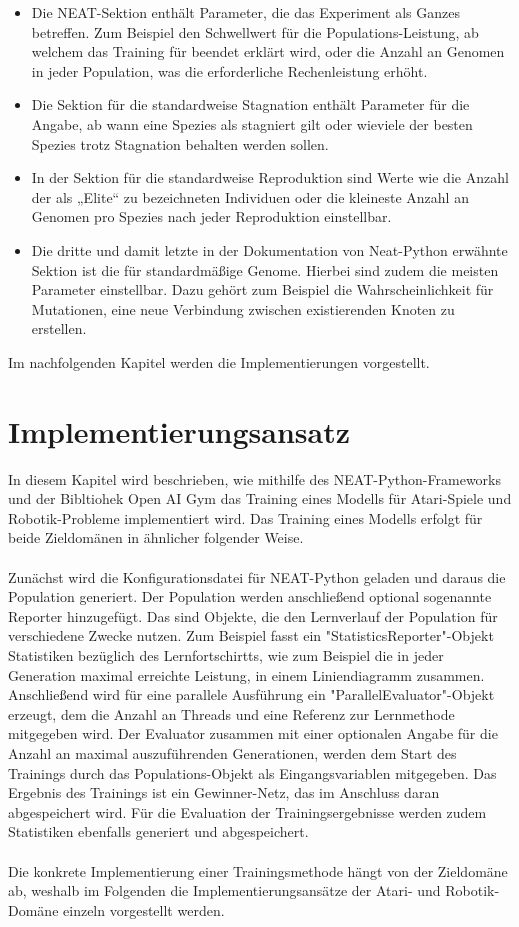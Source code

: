 \begin{itemize}
	\item Die NEAT-Sektion enthält Parameter, die das Experiment als Ganzes betreffen. Zum Beispiel den Schwellwert für die Populations-Leistung, ab welchem das Training für beendet erklärt wird, oder die Anzahl an Genomen in jeder Population, was die erforderliche Rechenleistung erhöht.
	\item Die Sektion für die standardweise Stagnation enthält Parameter für die Angabe, ab wann eine Spezies als stagniert gilt oder wieviele der besten Spezies trotz Stagnation behalten werden sollen.
	\item In der Sektion für die standardweise Reproduktion sind Werte wie die Anzahl der als „Elite“ zu bezeichneten Individuen oder die kleineste Anzahl an Genomen pro Spezies nach jeder Reproduktion einstellbar.
	\item Die dritte und damit letzte in der Dokumentation von Neat-Python erwähnte Sektion ist die für standardmäßige Genome. Hierbei sind zudem die meisten Parameter einstellbar. Dazu gehört zum Beispiel die Wahrscheinlichkeit für Mutationen, eine neue Verbindung zwischen existierenden Knoten zu erstellen.
\end{itemize}
Im nachfolgenden Kapitel werden die Implementierungen vorgestellt.
\chapter{Implementierungsansatz}
In diesem Kapitel wird beschrieben, wie mithilfe des NEAT-Python-Frameworks und der Bibltiohek Open AI Gym das Training eines Modells für Atari-Spiele und Robotik-Probleme implementiert wird. Das Training eines Modells erfolgt für beide Zieldomänen in ähnlicher folgender Weise.
\\
\\
Zunächst wird die Konfigurationsdatei für NEAT-Python geladen und daraus die Population generiert. Der Population werden anschließend optional sogenannte Reporter hinzugefügt. Das sind Objekte, die den Lernverlauf der Population für verschiedene Zwecke nutzen. Zum Beispiel fasst ein "StatisticsReporter"-Objekt Statistiken bezüglich des Lernfortschirtts, wie zum Beispiel die in jeder Generation maximal erreichte Leistung, in einem Liniendiagramm zusammen. Anschließend wird für eine parallele Ausführung ein "ParallelEvaluator"-Objekt erzeugt, dem die Anzahl an Threads und eine Referenz zur Lernmethode mitgegeben wird. Der Evaluator zusammen mit einer optionalen Angabe für die Anzahl an maximal auszuführenden Generationen, werden dem Start des Trainings durch das Populations-Objekt als Eingangsvariablen mitgegeben. Das Ergebnis des Trainings ist ein Gewinner-Netz, das im Anschluss daran abgespeichert wird. Für die Evaluation der Trainingsergebnisse werden zudem Statistiken ebenfalls generiert und abgespeichert.
\\
\\
Die konkrete Implementierung einer Trainingsmethode hängt von der Zieldomäne ab, weshalb im Folgenden die Implementierungsansätze der Atari- und Robotik-Domäne einzeln vorgestellt werden.
